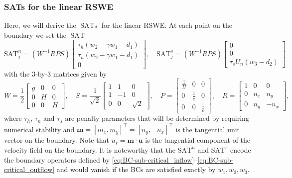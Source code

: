 \documentclass{article}
\numberwithin{equation}{section}
\theoremstyle{definition}
\begin{document}
\subsubsection{SATs for the linear RSWE}
Here, we will derive the $\operatorname{SATs}$ for the linear RSWE. At each point on the boundary we set the $\operatorname{SAT}$
\begin{equation}\label{eq:sat-linear}
\mathrm{SAT}^{n}_{j} = 
\left({W}^{-1}R{P}{S}\right)
\begin{bmatrix}
    \tau_h\left(w_2 - \gamma w_1- d_1\right)\\
     \tau_n\left(w_2 - \gamma w_1- d_1\right)\\
     0
\end{bmatrix},
\quad
\mathrm{SAT}^{s}_{j} = 
\left({W}^{-1}R{P}{S}\right)
\begin{bmatrix}
    0\\
    0\\
     \tau_s U_n\left(w_3- d_2\right)
\end{bmatrix}
\end{equation}
with the $3$-by-$3$ matrices given by
$$
 W =  \frac{1}{2}\begin{bmatrix}
g & 0 & 0\\
0 & H & 0\\
0 & 0 & H
\end{bmatrix}
,\quad 
S = \frac{1}{\sqrt{2}}\begin{bmatrix}
        1&1 & 0\\
        1&-1&0\\
        0 & 0 & \sqrt{2}
    \end{bmatrix}, \quad 
    {P}
     = \begin{bmatrix}
        \frac{1}{H}&0 & 0\\
        0&\frac{1}{c}&0\\
        0 & 0 & \frac{1}{c}
    \end{bmatrix},
    \quad
{R}
     = \begin{bmatrix}
        1 &0 & 0\\
        0&n_x&n_y\\
        0 & n_y & -n_x
    \end{bmatrix},
$$
where $\tau_h$, $\tau_n$ and $\tau_s$ are penalty parameters that will be determined by requiring numerical stability and $\bm{m} = [m_x, m_y]^\top = [n_y, -n_x]^\top$ is the tangential unit vector on the boundary. Note that $u_s = \bm{m}\cdot \bm{u}$ is the tangential component of the velocity field on the boundary. It is noteworthy that the $\mathrm{SAT}^{n}$ and $\mathrm{SAT}^{s}$ encode the boundary operators defined by \eqref{eq:BC-sub-critical_inflow}--\eqref{eq:BC-sub-critical_outflow} and would vanish if the BCs are satisfied exactly by $w_1, w_2, w_3$.
\end{document}
